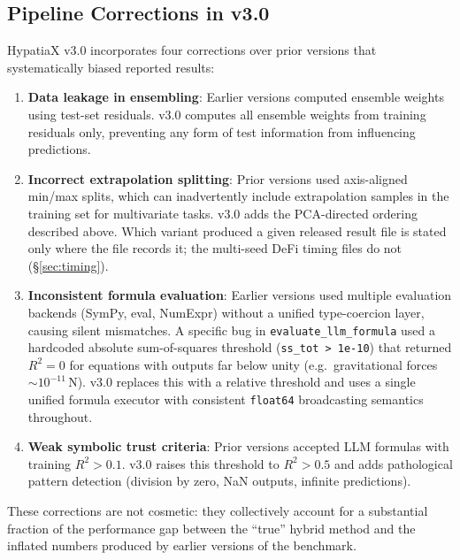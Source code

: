 \documentclass[twoside,11pt]{article}
\newcommand{\Rsq}{R^{2}}
\begin{document}
\subsection{Pipeline Corrections in v3.0}\label{subsec:pipeline-corrections-in-v30}
\label{sec:r2_bugfix}
\label{sec:corrections}

HypatiaX v3.0 incorporates four corrections over prior versions that systematically
biased reported results:

\begin{enumerate}[leftmargin=2em,label=\arabic*.]
  \item \textbf{Data leakage in ensembling}: Earlier versions computed ensemble
    weights using test-set residuals.  v3.0 computes all ensemble weights from
    training residuals only, preventing any form of test information from
    influencing predictions.

  \item \textbf{Incorrect extrapolation splitting}: Prior versions used axis-aligned
    min/max splits, which can inadvertently include extrapolation samples in the
    training set for multivariate tasks.  v3.0 adds the PCA-directed ordering
    described above. Which variant produced a given released result file is
    stated only where the file records it; the multi-seed DeFi timing files do
    not (\S\ref{sec:timing}).

  \item \textbf{Inconsistent formula evaluation}: Earlier
    versions used multiple evaluation backends (SymPy, eval, NumExpr) without a
    unified type-coercion layer, causing silent mismatches.  A specific bug in
    \texttt{evaluate\_llm\_formula} used a hardcoded absolute sum-of-squares
    threshold (\texttt{ss\_tot > 1e-10}) that returned $\Rsq = 0$ for equations
    with outputs far below unity (e.g.\ gravitational forces $\sim 10^{-11}$\,N).
    v3.0 replaces this with a relative threshold and uses a single unified formula
    executor with consistent \texttt{float64} broadcasting semantics throughout.

  \item \textbf{Weak symbolic trust criteria}: Prior versions accepted LLM formulas
    with training $\Rsq > 0.1$.  v3.0 raises this threshold to $\Rsq > 0.5$ and
    adds pathological pattern detection (division by zero, NaN outputs, infinite
    predictions).
\end{enumerate}

These corrections are not cosmetic: they collectively account for a substantial
fraction of the performance gap between the ``true'' hybrid method and the inflated numbers produced by earlier versions of the benchmark.
\end{document}
